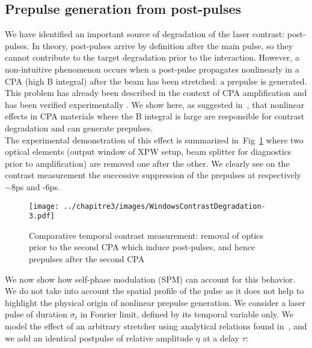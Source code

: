 \subsection{Prepulse generation from post-pulses}

We have identified an important source of degradation of the laser contrast: post-pulses. In theory, post-pulses arrive by definition after the main pulse, so they cannot contribute to the target degradation prior to the interaction. However, a non-intuitive phenomenon occurs when a post-pulse propagates nonlinearly in a CPA (high B integral) after the beam has been stretched: a prepulse is generated. This problem has already been described in the context of CPA amplification \cite{oakley1998improving,ren2010pulse,bromage2012temporal} and has been verified experimentally \cite{oakley1998improving,didenko2008contrast}. We show here, as suggested in~\cite{kalashnikov2009limits}, that nonlinear effects in CPA materials where the B integral is large are responsible for contrast degradation and can generate prepulses.\\



\noindent The experimental demonstration of this effect is summarized in~Fig~\ref{fig:WindowsContrastDegradation-2} where two optical elements (output window of XPW setup, beam splitter for diagnostics prior to amplification) are removed one after the other. We clearly see on the contrast measurement the successive suppression of the prepulses at respectively $-8$ps and -$6$ps. \\



\begin{figure}[H]
\centering
\texttt{[image: ../chapitre3/images/WindowsContrastDegradation-3.pdf]}\\
\caption{\label{fig:WindowsContrastDegradation-2} Comparative temporal contrast measurement: removal of optics prior to the second CPA which induce post-pulses, and hence prepulses after the second CPA}
\end{figure}

\noindent We now show how self-phase modulation (SPM) can account for this behavior. We do not take into account the spatial profile of the pulse as it does not help to highlight the 
physical origin of nonlinear prepulse generation. We consider a laser pulse of duration $\sigma_t$ in Fourier limit, defined by its temporal variable only. We model the effect of an arbitrary stretcher using analytical relations found in~\cite{TheseArnaud}, and we add an identical postpulse of relative amplitude $\eta$ at a delay $\tau$:

